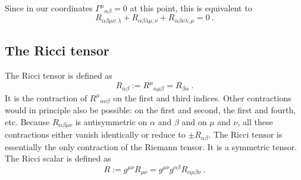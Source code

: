 \documentclass[12pt,a4paper]{article}
\begin{document}
Since in our coordinates $\Gamma^\mu{}_{\alpha\beta} = 0$ at this point, this is equivalent to
\begin{equation}
R_{\alpha\beta\mu\nu; \lambda} +R_{\alpha\beta\lambda\mu; \nu} +R_{\alpha\beta\nu\lambda; \mu} = 0 ~.
\end{equation}


\subsection{The Ricci tensor}
The Ricci tensor is defined as
\begin{equation}
R_{\alpha\beta} := R^\mu{}_{\alpha \mu\beta} = R_{\beta\alpha} ~.
\end{equation}
It is the contraction of $R^\mu{}_{\alpha \nu\beta}$ on the first and third indices. Other contractions would in principle also be possible: on the first and second, the first and fourth, etc. Because $R_{\alpha\beta\mu\nu}$ is antisymmetric on $\alpha$ and $\beta$ and on $\mu$ and $\nu$, all these contractions either vanish identically or reduce to $\pm R_{\alpha\beta}$. The Ricci tensor is essentially the only contraction of the Riemann tensor. It is a symmetric tensor. The Ricci scalar is defined as
\begin{equation}
R := g^{\mu\nu} R_{\mu\nu} = g^{\mu\nu} g^{\alpha\beta} R_{\alpha\mu\beta\nu}  ~.
\end{equation}







































































\end{document}
